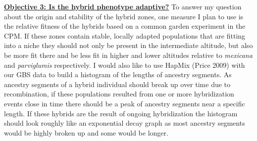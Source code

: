 \documentclass[12pt]{amsart}
\begin{document}
\hfill\break \textbf{\underline{Objective 3: Is the hybrid phenotype adaptive?} }To answer my question about the origin and stability of the hybrid zones, one measure I plan to use is the relative fitness of the hybrids based on a common garden experiment in the CPM. 
If these zones contain stable, locally adapted populations that are fitting into a niche they should not only be present in the intermediate altitude, but also be more fit there and be less fit in higher and lower altitudes relative to \textit{mexicana} and \textit{parviglumis} respectively.
I would also like to use HapMix (Price 2009) with our GBS data to build a histogram of the lengths of ancestry segments.
As ancestry segments of a hybrid individual should break up over time due to recombination, if these populations resulted from one or more hybridization events close in time there should be a peak of ancestry segments near a specific length.
If these hybrids are the result of ongoing hybridization the histogram should look roughly like an exponential decay graph as most ancestry segments would be highly broken up and some would be longer.%
\end{document}
